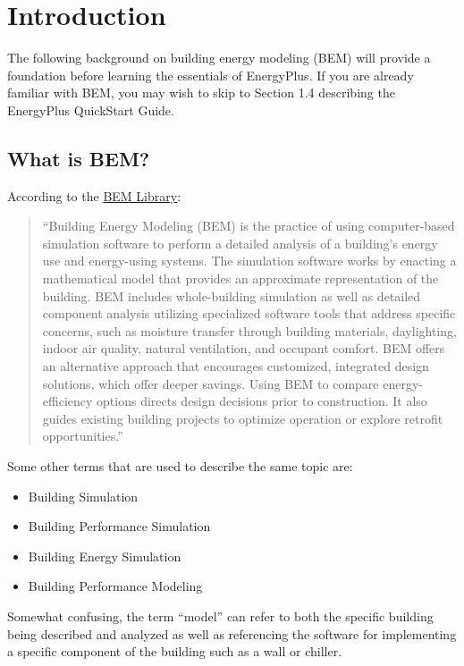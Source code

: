 

\chapter{Introduction}

The following background on building energy modeling (BEM) will provide
a foundation before learning the essentials of EnergyPlus. If you
are already familiar with BEM, you may wish to skip to Section 1.4
describing the EnergyPlus QuickStart Guide.

\section{What is BEM?}

According to the \href{https://www.bemlibrary.com/index.php/owners-managers/introduction/what-bem/}{BEM Library}:
\begin{quotation}
``Building Energy Modeling (BEM) is the practice of using computer-based
simulation software to perform a detailed analysis of a building\textquoteright s
energy use and energy-using systems. The simulation software works
by enacting a mathematical model that provides an approximate representation
of the building. BEM includes whole-building simulation as well as
detailed component analysis utilizing specialized software tools that
address specific concerns, such as moisture transfer through building
materials, daylighting, indoor air quality, natural ventilation, and
occupant comfort. BEM offers an alternative approach that encourages
customized, integrated design solutions, which offer deeper savings.
Using BEM to compare energy-efficiency options directs design decisions
prior to construction. It also guides existing building projects to
optimize operation or explore retrofit opportunities.''
\end{quotation}
Some other terms that are used to describe the same topic are:
\begin{itemize}
\item Building Simulation
\item Building Performance Simulation
\item Building Energy Simulation
\item Building Performance Modeling
\end{itemize}
Somewhat confusing, the term ``model'' can refer to both the specific
building being described and analyzed as well as referencing the software
for implementing a specific component of the building such as a wall
or chiller.

